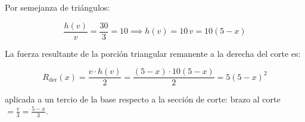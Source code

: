 Por semejanza de triángulos:

\begin{equation}

    \frac{h(v)}{v} = \frac{30}{3} = 10 \implies \boxed{h(v) = 10\,v = 10(5 - x)}

\end{equation}



La fuerza resultante de la porción triangular remanente a la derecha del corte es:

\begin{equation}

    R_{\text{der}}(x) = \frac{v \cdot h(v)}{2} = \frac{(5-x) \cdot 10(5-x)}{2} = 5(5 - x)^2

\end{equation}

aplicada a un tercio de la base respecto a la sección de corte: brazo al corte $= \frac{v}{3} = \frac{5 - x}{3}$.



